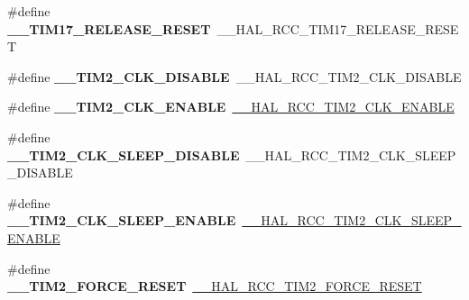 \begin{DoxyCompactItemize}
\#define {\bfseries \+\_\+\+\_\+\+T\+I\+M17\+\_\+\+R\+E\+L\+E\+A\+S\+E\+\_\+\+R\+E\+S\+ET}~\+\_\+\+\_\+\+H\+A\+L\+\_\+\+R\+C\+C\+\_\+\+T\+I\+M17\+\_\+\+R\+E\+L\+E\+A\+S\+E\+\_\+\+R\+E\+S\+ET
\item 
\mbox{\label{group___h_a_l___r_c_c___aliased_ga44d19f521b4c0161d7fb28c96bf5fbb7}} 
\#define {\bfseries \+\_\+\+\_\+\+T\+I\+M2\+\_\+\+C\+L\+K\+\_\+\+D\+I\+S\+A\+B\+LE}~\+\_\+\+\_\+\+H\+A\+L\+\_\+\+R\+C\+C\+\_\+\+T\+I\+M2\+\_\+\+C\+L\+K\+\_\+\+D\+I\+S\+A\+B\+LE
\item 
\mbox{\label{group___h_a_l___r_c_c___aliased_gae06cbd87c2db5dbb2aee0d47888374af}} 
\#define {\bfseries \+\_\+\+\_\+\+T\+I\+M2\+\_\+\+C\+L\+K\+\_\+\+E\+N\+A\+B\+LE}~\mbox{\hyperlink{group___r_c_c_ex___peripheral___clock___enable___disable_ga2e895257faa38376b9cdfcd756909a43}{\+\_\+\+\_\+\+H\+A\+L\+\_\+\+R\+C\+C\+\_\+\+T\+I\+M2\+\_\+\+C\+L\+K\+\_\+\+E\+N\+A\+B\+LE}}
\item 
\mbox{\label{group___h_a_l___r_c_c___aliased_ga6f8e4c63d5473a6af21a776fb1c20d1d}} 
\#define {\bfseries \+\_\+\+\_\+\+T\+I\+M2\+\_\+\+C\+L\+K\+\_\+\+S\+L\+E\+E\+P\+\_\+\+D\+I\+S\+A\+B\+LE}~\+\_\+\+\_\+\+H\+A\+L\+\_\+\+R\+C\+C\+\_\+\+T\+I\+M2\+\_\+\+C\+L\+K\+\_\+\+S\+L\+E\+E\+P\+\_\+\+D\+I\+S\+A\+B\+LE
\item 
\mbox{\label{group___h_a_l___r_c_c___aliased_gaad6d1c9176e1ca4c3eb67bfbd1d3be57}} 
\#define {\bfseries \+\_\+\+\_\+\+T\+I\+M2\+\_\+\+C\+L\+K\+\_\+\+S\+L\+E\+E\+P\+\_\+\+E\+N\+A\+B\+LE}~\mbox{\hyperlink{group___r_c_c_ex___peripheral___clock___sleep___enable___disable_ga975142c90b4e1baf21b361524518235d}{\+\_\+\+\_\+\+H\+A\+L\+\_\+\+R\+C\+C\+\_\+\+T\+I\+M2\+\_\+\+C\+L\+K\+\_\+\+S\+L\+E\+E\+P\+\_\+\+E\+N\+A\+B\+LE}}
\item 
\mbox{\label{group___h_a_l___r_c_c___aliased_ga436568ac94926e275ddcb03dc505af7d}} 
\#define {\bfseries \+\_\+\+\_\+\+T\+I\+M2\+\_\+\+F\+O\+R\+C\+E\+\_\+\+R\+E\+S\+ET}~\mbox{\hyperlink{group___r_c_c_ex___force___release___peripheral___reset_ga1010b7c4a9122449860babb341f01d7b}{\+\_\+\+\_\+\+H\+A\+L\+\_\+\+R\+C\+C\+\_\+\+T\+I\+M2\+\_\+\+F\+O\+R\+C\+E\+\_\+\+R\+E\+S\+ET}}
\item 
\mbox{\label{group___h_a_l___r_c_c___aliased_ga1e9358e947f8948c6a07915a5d291ca5}} 

\end{DoxyCompactItemize}
